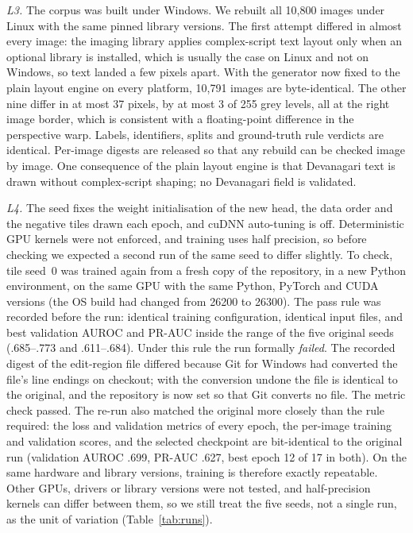 \documentclass[conference]{IEEEtran}
\begin{document}
\emph{L3.} The corpus was built under Windows. We rebuilt all 10,800
images under Linux with the same pinned library versions. The first
attempt differed in almost every image: the imaging library applies
complex-script text layout only when an optional library is installed,
which is usually the case on Linux and not on Windows, so text landed a
few pixels apart. With the generator now fixed to the plain layout
engine on every platform, 10,791 images are byte-identical. The other
nine differ in at most 37 pixels, by at most 3 of 255 grey levels, all
at the right image border, which is consistent with a floating-point
difference in the perspective warp. Labels, identifiers, splits and
ground-truth rule verdicts are identical. Per-image digests are
released so that any rebuild can be checked image by image. One
consequence of the plain layout engine is that Devanagari text is drawn
without complex-script shaping; no Devanagari field is validated.

\emph{L4.} The seed fixes the weight initialisation of the new head,
the data order and the negative tiles drawn each epoch, and cuDNN
auto-tuning is off. Deterministic GPU kernels were not enforced, and
training uses half precision, so before checking we expected a second
run of the same seed to differ slightly. To check, tile seed~0 was
trained again from a fresh copy of the repository, in a new Python
environment, on the same GPU with the same Python, PyTorch and CUDA
versions (the OS build had changed from 26200 to 26300). The pass rule
was recorded before the run: identical training configuration,
identical input files, and best validation AUROC and PR-AUC inside the
range of the five original seeds (.685--.773 and .611--.684). Under
this rule the run formally \emph{failed}. The recorded digest of the
edit-region file differed because Git for Windows had converted the
file's line endings on checkout; with the conversion undone the file is
identical to the original, and the repository is now set so that Git
converts no file. The metric check passed. The re-run also matched the
original more closely than the rule required: the loss and validation
metrics of every epoch, the per-image training and validation scores,
and the selected checkpoint are bit-identical to the original run
(validation AUROC .699, PR-AUC .627, best epoch 12 of 17 in both). On
the same hardware and library versions, training is therefore exactly
repeatable. Other GPUs, drivers or library versions were not tested,
and half-precision kernels can differ between them, so we still treat
the five seeds, not a single run, as the unit of variation
(Table~\ref{tab:runs}).
\end{document}
